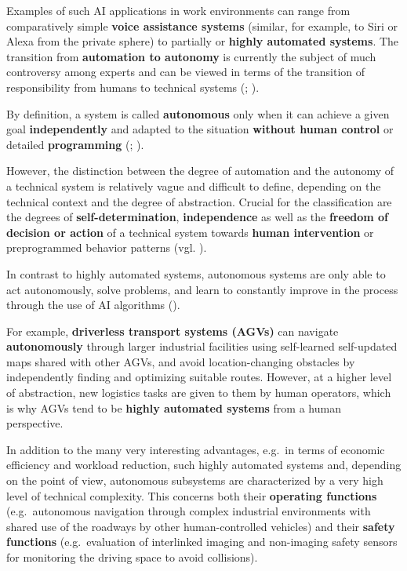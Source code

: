 \documentclass [oneside,10pt,a4paper,ngerman,BCOR10mm,headsepline,parindent,final]{scrartcl}
\begin{document}
Examples of such AI applications in work environments can range from
comparatively simple \textbf{voice assistance systems} (similar, for
example, to Siri or Alexa from the private sphere) to partially or
\textbf{highly automated systems}. The transition from
\textbf{automation to autonomy} is currently the subject of much
controversy among experts and can be viewed in terms of the transition
of responsibility from humans to technical systems (\cite{Adler_2021};
\cite{Adler_2019}).

By definition, a system is called \textbf{autonomous} only when it can
achieve a given goal \textbf{independently} and adapted to the situation
\textbf{without human control} or detailed \textbf{programming}
(\cite{EFI_autSysteme_2018}; \cite{acatech_2017}).

However, the distinction between the degree of automation and the
autonomy of a technical system is relatively vague and difficult to
define, depending on the technical context and the degree of
abstraction. Crucial for the classification are the degrees of
\textbf{self-determination}, \textbf{independence} as well as the
\textbf{freedom of decision or action} of a technical system towards
\textbf{human intervention} or preprogrammed behavior patterns (vgl.
\cite{Wiki_Autonomie}).

In contrast to highly automated systems, autonomous systems are only
able to act autonomously, solve problems, and learn to constantly
improve in the process through the use of AI algorithms
(\cite{acatech_2017}).

For example, \textbf{driverless transport systems (AGVs)} can navigate
\textbf{autonomously} through larger industrial facilities using
self-learned self-updated maps shared with other AGVs, and avoid
location-changing obstacles by independently finding and optimizing
suitable routes. However, at a higher level of abstraction, new
logistics tasks are given to them by human operators, which is why AGVs
tend to be \textbf{highly automated systems} from a human perspective.

In addition to the many very interesting advantages, e.g.~in terms of
economic efficiency and workload reduction, such highly automated
systems and, depending on the point of view, autonomous subsystems are
characterized by a very high level of technical complexity. This
concerns both their \textbf{operating functions} (e.g.~autonomous
navigation through complex industrial environments with shared use of
the roadways by other human-controlled vehicles) and their
\textbf{safety functions} (e.g.~evaluation of interlinked imaging and
non-imaging safety sensors for monitoring the driving space to avoid
collisions).
\end{document}
